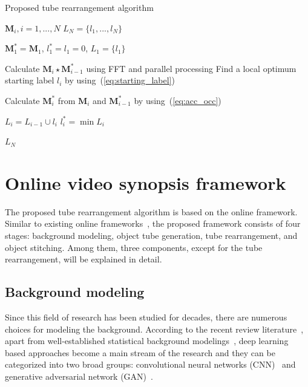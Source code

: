 \documentclass[11pt]{hyu_thesis}
\begin{document}
\begin{algorithm}[t]
	\caption{Proposed tube rearrangement algorithm}
	\label{alg:proposed}
	\begin{algorithmic}
		\REQUIRE $\textbf{M}_{i}, i = 1,...,N$
		\ENSURE $L_{N} = \{ l_{1},...,l_{N} \}$
		
		\STATE $\textbf{M}_{1}^{*} = \textbf{M}_{1}$, $l_{1}^{*} = l_{1} = 0$, $L_{1} = \{ l_{1} \}$
		
		\STATE Calculate $\textbf{M}_{i} \star \textbf{M}_{i-1}^{*}$ using FFT and parallel processing
		\STATE Find a local optimum starting label $l_{i}$ by using~(\ref{eq:starting_label})

		\STATE Calculate $\textbf{M}_{i}^{*}$ from $\textbf{M}_{i}$ and $\textbf{M}_{i-1}^{*}$ by using~(\ref{eq:acc_occ})

		\STATE $L_{i} = L_{i-1} \cup l_{i}$
		\STATE $l_{i}^{*} = \min L_{i}$
		\ENDFOR
		
		\RETURN $L_{N}$
	\end{algorithmic}
\end{algorithm}
\section{Online video synopsis framework}
\label{sec:framework}
The proposed tube rearrangement algorithm is based on the online framework. Similar to existing online frameworks~\cite{}, the proposed framework consists of four stages: background modeling, object tube generation, tube rearrangement, and object stitching. Among them, three components, except for the tube rearrangement, will be explained in detail.
\subsection{Background modeling}
Since this field of research has been studied for decades, there are numerous choices for modeling the background. According to the recent review literature~\cite{Bouwmans2018}, apart from well-established statistical background modelings~\cite{Zivkovic2004,Zivkovic2006,Barnich2009ViBe,Barnich2011ViBe,VanDroogenbroeck2012Background,VanDroogenbroeck2014ViBe,Hofmann2012,Muchtar2018}, deep learning based approaches become a main stream of the research and they can be categorized into two broad groups: convolutional neural networks (CNN)~\cite{Patil2018,Lim2018} and generative adversarial network (GAN)~\cite{Bakkay2018,Sultana2019,Sakkos2019}.
\end{document}
